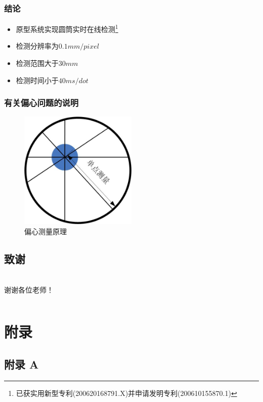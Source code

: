 \documentclass{beamer}
\begin{document}
\begin{frame}[label=conclusion]
  \frametitle{结论}
  \begin{itemize}
  \item
  原型系统实现圆筒实时在线检测\footnote{已获实用新型专利(200620168791.X)并申请发明专利(200610155870.1)}
  \item
  检测分辨率为$0.1mm/pixel$
  \item
  检测范围大于$30mm$
  \item
  检测时间小于$40ms/dot$
  \end{itemize}
  \hyperlink{patent<1>}{}
\end{frame}

\begin{frame}
  \frametitle{有关偏心问题的说明}
    \begin{figure}
    \center
    \includegraphics[width=0.5\textwidth]{image/heart}
    \caption{\small 偏心测量原理}
    \end{figure}
\end{frame}

\subsection*{致谢}

\begin{frame}
  \frametitle{\subsecname}
  \begin{columns}
  \column{3.5cm}
  \column{3.5cm}
  \large 谢谢各位老师！
  \column{3.5cm}
  \end{columns}
\end{frame}

\section*{附录}

\subsection*{附录 A}
\end{document}
